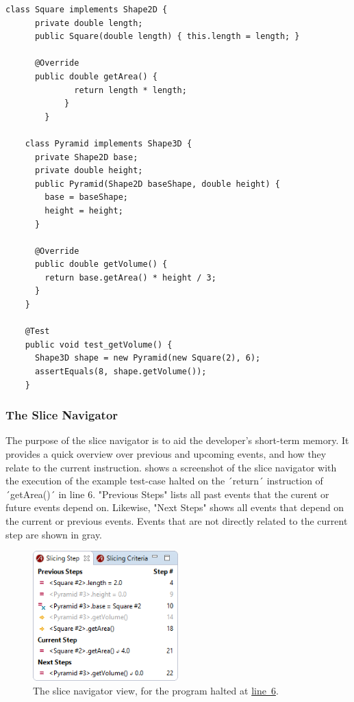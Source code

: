 \documentclass[english]{scrartcl}
\newcommand{\linerefn}[2]{\hyperref[#1]{line~#2}}
\begin{document}
\begin{lstlisting}[numberfirstline=true,firstnumber=1,label=lst:example,caption={Example program with a failing test case}]
  	class Square implements Shape2D {
  	  private double length;
  	  public Square(double length) { this.length = length; }
  	  
  	  @Override
  	  public double getArea() { 
			  return length * length; 
			}
		}
  	
  	class Pyramid implements Shape3D {
  	  private Shape2D base;
  	  private double height;
  	  public Pyramid(Shape2D baseShape, double height) {
  	    base = baseShape;
  	    height = height;
  	  }
  	  
  	  @Override
  	  public double getVolume() { 
  	    return base.getArea() * height / 3; 
  	  }
  	}
  	
    @Test
    public void test_getVolume() {
      Shape3D shape = new Pyramid(new Square(2), 6);
      assertEquals(8, shape.getVolume());
    }
\end{lstlisting}

\subsubsection{The Slice Navigator}

The purpose of the slice navigator is to aid the developer's short-term memory.
It provides a quick overview over previous and upcoming events, and how they relate to the current instruction.
 shows a screenshot of the slice navigator with the execution of the example test-case halted on the ´return´ instruction of ´getArea()´ in line 6.
"Previous Steps" lists all past events that the curent or future events depend on.
Likewise, "Next Steps" shows all events that depend on the current or previous events.
Events that are not directly related to the current step are shown in gray.

\begin{figure}
	\centering
		\includegraphics[width=0.50\textwidth]{img/slice1.png}
	\caption{The slice navigator view, for the program halted at \linerefn{lst:example}{6}.}
	\label{fig:slice1}
\end{figure}
\end{document}
